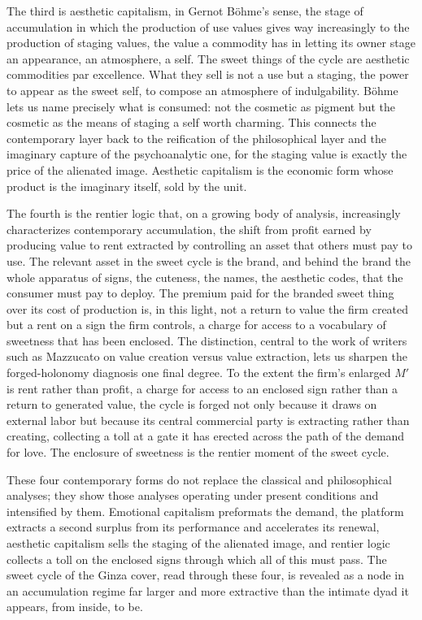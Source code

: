 The third is aesthetic capitalism, in Gernot Böhme's sense, the stage of accumulation in which the production of use values gives way increasingly to the production of staging values, the value a commodity has in letting its owner stage an appearance, an atmosphere, a self. The sweet things of the cycle are aesthetic commodities par excellence. What they sell is not a use but a staging, the power to appear as the sweet self, to compose an atmosphere of indulgability. Böhme lets us name precisely what is consumed: not the cosmetic as pigment but the cosmetic as the means of staging a self worth charming. This connects the contemporary layer back to the reification of the philosophical layer and the imaginary capture of the psychoanalytic one, for the staging value is exactly the price of the alienated image. Aesthetic capitalism is the economic form whose product is the imaginary itself, sold by the unit.

The fourth is the rentier logic that, on a growing body of analysis, increasingly characterizes contemporary accumulation, the shift from profit earned by producing value to rent extracted by controlling an asset that others must pay to use. The relevant asset in the sweet cycle is the brand, and behind the brand the whole apparatus of signs, the cuteness, the names, the aesthetic codes, that the consumer must pay to deploy. The premium paid for the branded sweet thing over its cost of production is, in this light, not a return to value the firm created but a rent on a sign the firm controls, a charge for access to a vocabulary of sweetness that has been enclosed. The distinction, central to the work of writers such as Mazzucato on value creation versus value extraction, lets us sharpen the forged-holonomy diagnosis one final degree. To the extent the firm's enlarged $M'$ is rent rather than profit, a charge for access to an enclosed sign rather than a return to generated value, the cycle is forged not only because it draws on external labor but because its central commercial party is extracting rather than creating, collecting a toll at a gate it has erected across the path of the demand for love. The enclosure of sweetness is the rentier moment of the sweet cycle.

These four contemporary forms do not replace the classical and philosophical analyses; they show those analyses operating under present conditions and intensified by them. Emotional capitalism preformats the demand, the platform extracts a second surplus from its performance and accelerates its renewal, aesthetic capitalism sells the staging of the alienated image, and rentier logic collects a toll on the enclosed signs through which all of this must pass. The sweet cycle of the Ginza cover, read through these four, is revealed as a node in an accumulation regime far larger and more extractive than the intimate dyad it appears, from inside, to be.

